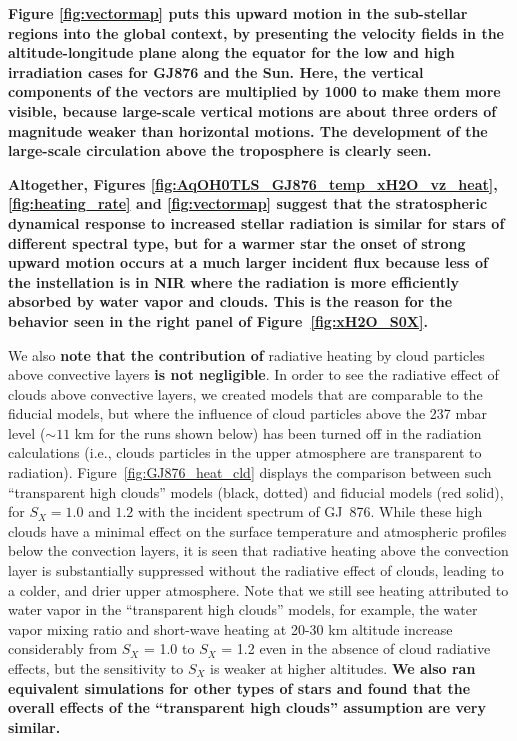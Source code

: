 \documentclass[11pt,numberedappendix,twocolappendix,]{emulateapj}
\def\wv{water vapor}
\def\revise#1{{\bf #1}}
\begin{document}
\revise{Figure \ref{fig:vectormap} puts this upward motion in the sub-stellar regions into the global context, by presenting the velocity fields in the altitude-longitude plane along the equator for the low and high irradiation cases for GJ876 and the Sun. %
Here, the vertical components of the vectors are multiplied by 1000 to make them more visible, because large-scale vertical motions are about three orders of magnitude weaker than horizontal motions. %
The development of the large-scale circulation above the troposphere is clearly seen. }

\revise{ Altogether, Figures \ref{fig:AqOH0TLS_GJ876_temp_xH2O_vz_heat}, \ref{fig:heating_rate} and \ref{fig:vectormap} suggest that the stratospheric dynamical response to increased stellar radiation is similar for stars of different spectral type, but for a warmer star the onset of strong upward motion occurs at a much larger incident flux because less of the instellation is in NIR where the radiation is more efficiently absorbed by \wv{} and clouds. %
This is the reason for the behavior seen in the right panel of Figure~\ref{fig:xH2O_S0X}. }

We also \revise{note that the contribution of} radiative heating by cloud particles above convective layers \revise{is not negligible}. 
In order to see the radiative effect of clouds above convective layers, we created models that are comparable to the fiducial models, but where the  influence of cloud particles above the 237 mbar level ($\sim 11$ km for the runs shown below) has been turned off in the radiation calculations (i.e., clouds particles in the upper atmosphere are transparent to radiation). 
Figure~\ref{fig:GJ876_heat_cld} displays the comparison between such ``transparent high clouds'' models (black, dotted) and fiducial models (red solid), for $S_X=1.0$ and $1.2$ with the incident spectrum of GJ~876. 
While these high clouds have a minimal effect on the surface temperature and atmospheric profiles below the convection layers, it is seen that radiative heating above the convection layer is substantially suppressed without the radiative effect of clouds, leading to a colder, and drier upper atmosphere. 
Note that we still see heating attributed to water vapor in the ``transparent high clouds'' models, for example, the \wv{} mixing ratio and short-wave heating at 20-30 km altitude increase considerably from $S_X$ = 1.0 to $S_X$ = 1.2 even in the absence of cloud radiative effects, but the sensitivity to $S_X$ is weaker at higher altitudes. 
\revise{We also ran equivalent simulations for other types of stars and found that the overall effects of the ``transparent high clouds'' assumption are very similar.}
\end{document}
